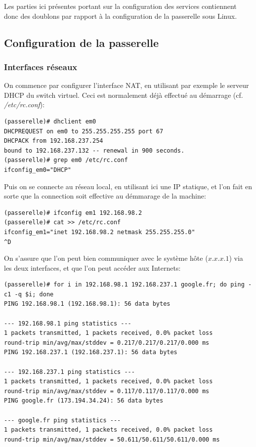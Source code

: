 \documentclass[a4paper]{article}
\begin{document}
Les parties ici présentes portant sur la configuration des services
contiennent donc des doublons par rapport à la configuration
de la passerelle sous Linux.

\subsection{Configuration de la passerelle}
\subsubsection{Interfaces réseaux}
On commence par configurer l'interface NAT, en utilisant par
exemple le serveur DHCP du switch virtuel. Ceci est normalement
déjà effectué au démarrage (cf. \textit{/etc/rc.conf}):
\begin{verbatim}
(passerelle)# dhclient em0
DHCPREQUEST on em0 to 255.255.255.255 port 67
DHCPACK from 192.168.237.254
bound to 192.168.237.132 -- renewal in 900 seconds.
(passerelle)# grep em0 /etc/rc.conf 
ifconfig_em0="DHCP"
\end{verbatim}

Puis on se connecte au réseau local, en utilisant ici une IP
statique, et l'on fait en sorte que la connection soit effective
au démmarage de la machine:
\begin{verbatim}
(passerelle)# ifconfig em1 192.168.98.2
(passerelle)# cat >> /etc/rc.conf
ifconfig_em1="inet 192.168.98.2 netmask 255.255.255.0"
^D
\end{verbatim}

On s'assure que l'on peut bien communiquer avec le système hôte
($x.x.x.1$) via les deux interfaces, et que l'on peut accéder aux
Internets:
\begin{verbatim}
(passerelle)# for i in 192.168.98.1 192.168.237.1 google.fr; do ping -c1 -q $i; done
PING 192.168.98.1 (192.168.98.1): 56 data bytes

--- 192.168.98.1 ping statistics ---
1 packets transmitted, 1 packets received, 0.0% packet loss
round-trip min/avg/max/stddev = 0.217/0.217/0.217/0.000 ms
PING 192.168.237.1 (192.168.237.1): 56 data bytes

--- 192.168.237.1 ping statistics ---
1 packets transmitted, 1 packets received, 0.0% packet loss
round-trip min/avg/max/stddev = 0.117/0.117/0.117/0.000 ms
PING google.fr (173.194.34.24): 56 data bytes

--- google.fr ping statistics ---
1 packets transmitted, 1 packets received, 0.0% packet loss
round-trip min/avg/max/stddev = 50.611/50.611/50.611/0.000 ms
\end{verbatim}
\end{document}
